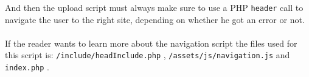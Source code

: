 And then the upload script must always make sure to use a PHP \texttt{header} call to navigate the user to the right site, depending on whether he got an error or not.\\
\\
If the reader wants to learn more about the navigation script the files used for this script is: \texttt{/include/headInclude.php} , \texttt{/assets/js/navigation.js} and \texttt{index.php} .

